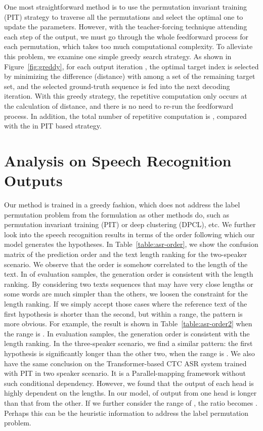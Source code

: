 \documentclass{article}
\begin{document}
One most straightforward method is to use the permutation invariant training (PIT) strategy to traverse all the permutations and select the optimal one to update the parameters. However, with the teacher-forcing technique attending each step of the output, we must go through the whole feedforward process for each permutation, which takes too much computational complexity. To alleviate this problem, we examine one simple greedy search strategy. As shown in Figure~\ref{fig:greddy}, for each output iteration , the optimal target index is selected by minimizing the difference (distance) with  among a set of the remaining target set, and the selected ground-truth sequence  is fed into the next decoding iteration. With this greedy strategy, the repetitive computation only occurs at the calculation of distance, and there is no need to re-run the feedforward process. In addition, the total number of repetitive computation is , compared with the  in PIT based strategy. 

\section{Analysis on Speech Recognition Outputs}\label{appendix:asr_output_analysis}
Our method is trained in a greedy fashion, which does not address the label permutation problem from the formulation as other methods do, such as permutation invariant training (PIT) or deep clustering (DPCL), etc. We further look into the speech recognition results in terms of the order following which our model generates the hypotheses. In Table~\ref{table:asr-order}, we show the confusion matrix of the prediction order and the text length ranking for the two-speaker scenario. We observe that the order is somehow correlated to the length of the text. 
In  of evaluation samples, the generation order is consistent with the length ranking. By considering two texts sequences that may have very close lengths or some words are much simpler than the others, we loosen the constraint for the length ranking. If we simply accept those cases where the reference text of the first hypothesis is shorter than the second, but within a range, the pattern is more obvious. For example, the result is shown in Table~\ref{table:asr-order2} when the range is .
In  evaluation samples, the generation order is consistent with the length ranking.
In the three-speaker scenario, we find a similar pattern: the first hypothesis is significantly longer than the other two,  when the range is . We also have the same conclusion on the Transformer-based CTC ASR system trained with PIT in two speaker scenario. It is a Parallel-mapping framework without such conditional dependency. However, we found that the output of each head is highly dependent on the lengths. In our model, 
 of output from one head is longer than that from the other. If we further consider the range of , the ratio becomes 
. Perhaps this can be the heuristic information to address the label permutation problem.
\end{document}
